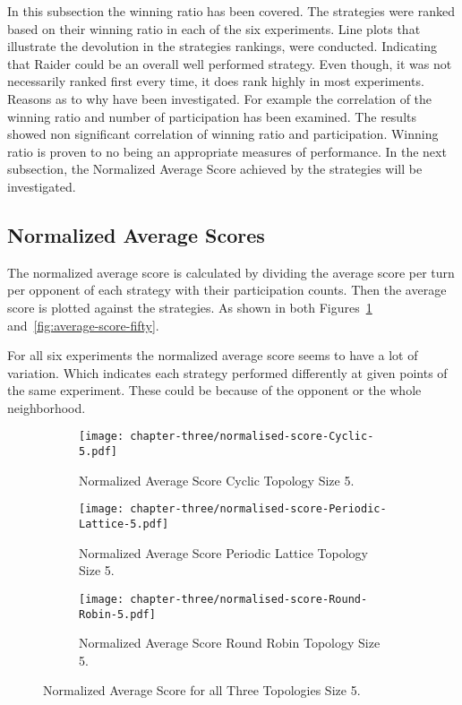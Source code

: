 In this subsection the winning ratio has been covered. The strategies were ranked
based on their winning ratio in each of the
six experiments. Line plots that illustrate the devolution in the strategies
rankings, were conducted. Indicating that Raider could be an overall well performed
strategy. Even though, it was not necessarily ranked first every time,
it does rank highly in most experiments. Reasons as to why have been investigated.
For example the correlation
of the winning ratio and number of participation has been examined. The results
showed non significant correlation of winning ratio and participation. Winning
ratio is proven to no being an appropriate measures of performance.
In the next subsection, the Normalized Average Score achieved by the strategies
will be investigated.

\subsection{Normalized Average Scores}
\label{sub:normalized_av_score}

The normalized average score is calculated by dividing the average score per
turn per opponent
of each strategy with their participation counts. Then the average score
is plotted against the strategies. As shown in both
Figures~\ref{fig:average-score-five} and~\ref{fig:average-score-fifty}.

For all six experiments the normalized average score seems to have a lot
of variation. Which indicates each strategy performed differently at given
points of the same experiment. These could be because of the opponent or the
whole neighborhood.

\begin{figure}[H]
\centering
    \begin{subfigure}[t]{0.8\textwidth}
    \centering
        \texttt{[image: chapter-three/normalised-score-Cyclic-5.pdf]}
    \caption{Normalized Average Score Cyclic Topology Size 5.}
    \end{subfigure}
\hfill
    \begin{subfigure}[t]{0.8\textwidth}\centering
    \centering
        \texttt{[image: chapter-three/normalised-score-Periodic-Lattice-5.pdf]}
    \caption{Normalized Average Score Periodic Lattice Topology Size 5.}
    \end{subfigure}
\hfill
    \begin{subfigure}[t]{0.8\textwidth}\centering
    \centering
        \texttt{[image: chapter-three/normalised-score-Round-Robin-5.pdf]}
    \caption{Normalized Average Score Round Robin Topology Size 5.}
    \end{subfigure}
\caption{Normalized Average Score for all Three Topologies Size 5.}
\label{fig:average-score-five}
\end{figure}

